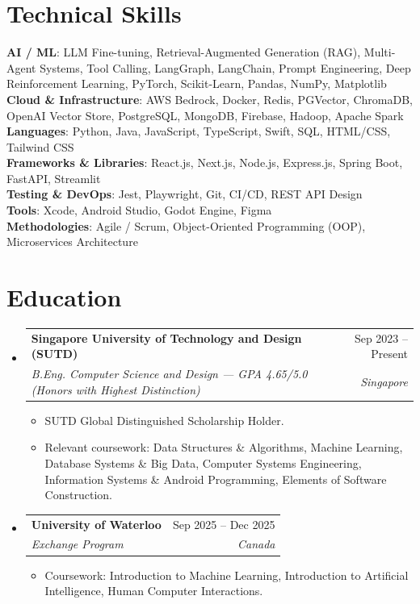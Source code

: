 \documentclass[letterpaper,11pt]{article}
\makeatletter
\newcommand{\resumeItem}[1]{
  \item\small{#1 \vspace{-2pt}}
}
\newcommand{\resumeSubheading}[4]{
  \vspace{-2pt}\item
    \begin{tabular*}{0.97\textwidth}[t]{l@{\extracolsep{\fill}}r}
      \textbf{#1} & #2 \\
      \textit{\small#3} & \textit{\small #4} \\
    \end{tabular*}\vspace{-7pt}
}
\newcommand{\resumeSubHeadingListStart}{\begin{itemize}[leftmargin=0.15in, label={}]}
\newcommand{\resumeSubHeadingListEnd}{\end{itemize}}
\newcommand{\resumeItemListStart}{\begin{itemize}}
\newcommand{\resumeItemListEnd}{\end{itemize}\vspace{-5pt}}
\makeatother
\begin{document}
\section{Technical Skills}
 \begin{itemize}[leftmargin=0.15in, label={}]
    \small{\item{
     \textbf{AI / ML}{: LLM Fine-tuning, Retrieval-Augmented Generation (RAG), Multi-Agent Systems, Tool Calling, LangGraph, LangChain, Prompt Engineering, Deep Reinforcement Learning, PyTorch, Scikit-Learn, Pandas, NumPy, Matplotlib} \\
     \textbf{Cloud \& Infrastructure}{: AWS Bedrock, Docker, Redis, PGVector, ChromaDB, OpenAI Vector Store, PostgreSQL, MongoDB, Firebase, Hadoop, Apache Spark} \\
     \textbf{Languages}{: Python, Java, JavaScript, TypeScript, Swift, SQL, HTML/CSS, Tailwind CSS} \\
     \textbf{Frameworks \& Libraries}{: React.js, Next.js, Node.js, Express.js, Spring Boot, FastAPI, Streamlit} \\
     \textbf{Testing \& DevOps}{: Jest, Playwright, Git, CI/CD, REST API Design} \\
     \textbf{Tools}{: Xcode, Android Studio, Godot Engine, Figma} \\
     \textbf{Methodologies}{: Agile / Scrum, Object-Oriented Programming (OOP), Microservices Architecture} \\
    }}
 \end{itemize}

\section{Education}
  \resumeSubHeadingListStart
    \resumeSubheading
      {Singapore University of Technology and Design (SUTD)}{Sep 2023 -- Present}
      {B.Eng. Computer Science and Design — GPA 4.65/5.0 (Honors with Highest Distinction)}{Singapore}
      \resumeItemListStart
        \resumeItem{SUTD Global Distinguished Scholarship Holder.}
        \resumeItem{Relevant coursework: Data Structures \& Algorithms, Machine Learning, Database Systems \& Big Data, Computer Systems Engineering, Information Systems \& Android Programming, Elements of Software Construction.}
      \resumeItemListEnd
    \resumeSubheading
      {University of Waterloo}{Sep 2025 -- Dec 2025}
      {Exchange Program}{Canada}
      \resumeItemListStart
        \resumeItem{Coursework: Introduction to Machine Learning, Introduction to Artificial Intelligence, Human Computer Interactions.}
      \resumeItemListEnd
  \resumeSubHeadingListEnd
\end{document}
